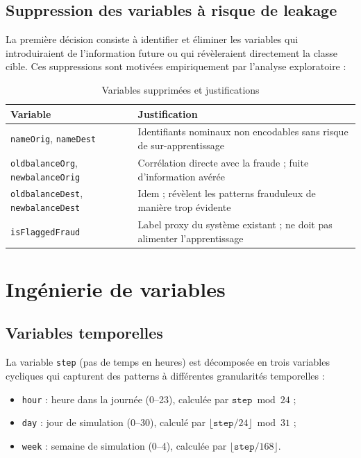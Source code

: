 \subsection{Suppression des variables à risque de leakage}

La première décision consiste à identifier et éliminer les variables qui introduiraient de
l'information future ou qui révèleraient directement la classe cible. Ces suppressions sont
motivées empiriquement par l'analyse exploratoire :

\begin{table}[H]
\centering
\caption{Variables supprimées et justifications}
\label{tab:cols_dropped}
\begin{tabular}{p{4cm}p{8cm}}
\toprule
\textbf{Variable} & \textbf{Justification} \\
\midrule
\texttt{nameOrig}, \texttt{nameDest}
  & Identifiants nominaux non encodables sans risque de sur-apprentissage \\[0.2cm]
\texttt{oldbalanceOrg}, \texttt{newbalanceOrig}
  & Corrélation directe avec la fraude ; fuite d'information avérée \\[0.2cm]
\texttt{oldbalanceDest}, \texttt{newbalanceDest}
  & Idem ; révèlent les patterns frauduleux de manière trop évidente \\[0.2cm]
\texttt{isFlaggedFraud}
  & Label proxy du système existant ; ne doit pas alimenter l'apprentissage \\
\bottomrule
\end{tabular}
\end{table}

\section{Ingénierie de variables}

\subsection{Variables temporelles}

La variable \texttt{step} (pas de temps en heures) est décomposée en trois variables
cycliques qui capturent des patterns à différentes granularités temporelles :

\begin{itemize}
  \item \texttt{hour} : heure dans la journée (0--23), calculée par
    $\texttt{step} \bmod 24$ ;
  \item \texttt{day} : jour de simulation (0--30), calculé par
    $\lfloor \texttt{step} / 24 \rfloor \bmod 31$ ;
  \item \texttt{week} : semaine de simulation (0--4), calculée par
    $\lfloor \texttt{step} / 168 \rfloor$.
\end{itemize}

